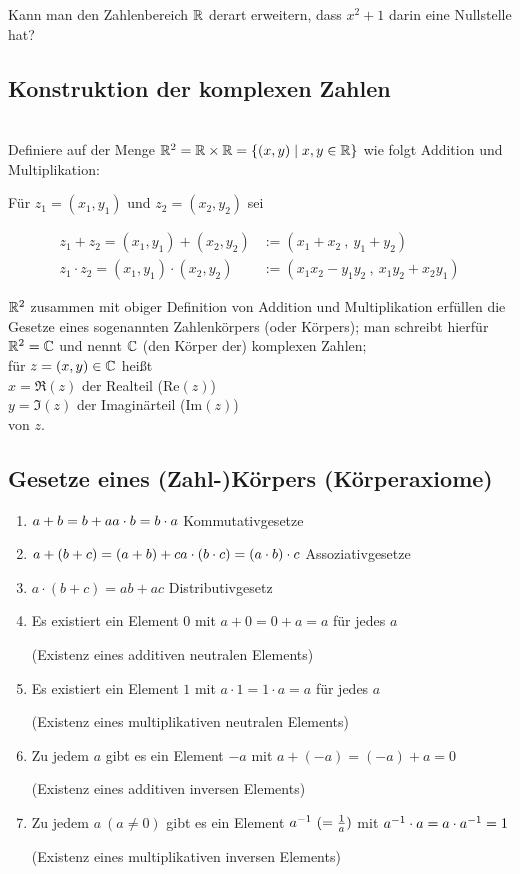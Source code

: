 Kann man den Zahlenbereich $\mathbb{R}$ derart erweitern, dass $x^2+1$ darin eine Nullstelle hat?

\subsection{Konstruktion der komplexen Zahlen}
\ \\
Definiere auf der Menge $\mathbb{R}^2=\mathbb{R}\times\mathbb{R}=\{(x,y)\mid x,y\in\mathbb{R}\}$ wie folgt Addition und Multiplikation:

Für $z_1 = (x_1,y_1)$ und $z_2=(x_2,y_2)$ sei

\vspace{-7ex}
\begin{align*}
	z_1 + z_2 = (x_1,y_1)+(x_2,y_2)&:=(x_1+x_2\ ,\ y_1+y_2)\\
	z_1 \cdot z_2 = (x_1,y_1)\cdot(x_2,y_2)&:=(x_1x_2-y_1y_2\ ,\ x_1y_2+x_2y_1)
\end{align*}

\vspace{-6ex}
\Def $\mathbb{R}^2$ zusammen mit obiger Definition von Addition und Multiplikation erfüllen die Gesetze eines sogenannten Zahlenkörpers (oder Körpers); man schreibt hierfür $\mathbb{R}^2 = \mathbb{C}$ und nennt $\mathbb{C}$ (den Körper der) komplexen Zahlen;\\
für $z=(x,y)\in \mathbb{C}$ heißt\\
$x= \Re(z)$ der Realteil {\tiny(Re$(z)$)}\\
$y= \Im(z)$ der Imaginärteil {\tiny(Im$(z)$)}\\
von $z$.

\subsection{Gesetze eines (Zahl-)Körpers (Körperaxiome)}
\begin{enumerate}
	\item $a + b = b + a\\a \cdot b = b \cdot a$ \hfill Kommutativgesetze
	\item $a+(b+c)=(a+b)+c\\a\cdot (b\cdot c)=(a\cdot b)\cdot c$ \hfill Assoziativgesetze
	\item $a\cdot(b+c)= ab+ac$ \hfill Distributivgesetz
	\item Es existiert ein Element $0$ mit $a+0= 0+a = a$ für jedes $a$\\
	\parbox{0ex}{}\hfill (Existenz eines additiven neutralen Elements)
	\item Es existiert ein Element $1$ mit $a\cdot 1 = 1\cdot a = a$ für jedes $a$\\
	\parbox{0ex}{}\hfill (Existenz eines multiplikativen neutralen Elements)
	\item Zu jedem $a$ gibt es ein Element $-a$ mit $a + (-a) = (-a) + a = 0$\\
	\parbox{0ex}{}\hfill (Existenz eines additiven inversen Elements)
	\item Zu jedem $a\ (a \ne 0)$ gibt es ein Element $\inv{a}\ (=\frac{1}{a})$ mit ${a}^{-1} \cdot a = a \cdot {a}^{-1} = 1$\\
	\parbox{0ex}{}\hfill (Existenz eines multiplikativen inversen Elements)
\end{enumerate}

